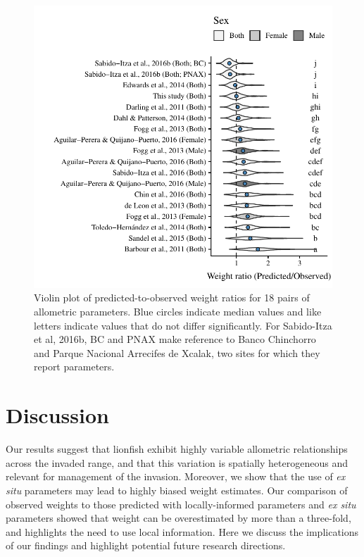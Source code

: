 \documentclass[fleqn,10pt,lineno]{wlpeerj} %
\begin{document}
\begin{figure}
\centering
\includegraphics{Manuscript_files/figure-latex/pred_obs-1.pdf}
\caption{\label{fig:bio_ratio}Violin plot of predicted-to-observed
weight ratios for 18 pairs of allometric parameters. Blue circles
indicate median values and like letters indicate values that do not
differ significantly. For Sabido-Itza et al, 2016b, BC and PNAX make
reference to Banco Chinchorro and Parque Nacional Arrecifes de Xcalak,
two sites for which they report parameters.}
\end{figure}

\clearpage

\section*{Discussion}

Our results suggest that lionfish exhibit highly variable allometric
relationships across the invaded range, and that this variation is
spatially heterogeneous and relevant for management of the invasion.
Moreover, we show that the use of \emph{ex situ} parameters may lead to
highly biased weight estimates. Our comparison of observed weights to
those predicted with locally-informed parameters and \emph{ex situ}
parameters showed that weight can be overestimated by more than a
three-fold, and highlights the need to use local information. Here we
discuss the implications of our findings and highlight potential future
research directions.
\end{document}
